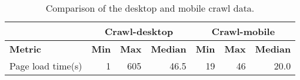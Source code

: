 \begin{table}[ht] 
\caption{Comparison of the desktop and mobile crawl data.} 
\centering 
\begin{tabular}{|l|rrl|lll|} 
\hline 
\textbf{} & \multicolumn{3}{c|}{\textbf{Crawl-desktop}} & \multicolumn{3}{c|}{\textbf{Crawl-mobile}} \\ \hline 
\textbf{Metric} & \multicolumn{1}{r|}{\textbf{Min}} & \multicolumn{1}{r|}{\textbf{Max}} & \textbf{Median} & \multicolumn{1}{l|}{\textbf{Min}} & \multicolumn{1}{l|}{\textbf{Max}} & \textbf{Median} \\ \hline 
Page load time(s) & \multicolumn{1}{r|}{1} & \multicolumn{1}{r|}{605} & \multicolumn{1}{r|}{46.5} & \multicolumn{1}{r|}{19} & \multicolumn{1}{r|}{46} & \multicolumn{1}{r|}{20.0} \\ \hline 
\end{tabular} 
\label{table:Comparison} 
\end{table}